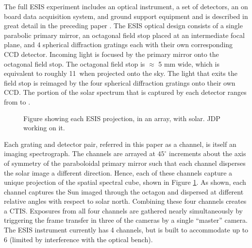     	The full ESIS experiment includes an optical instrument, a set of detectors, an on board data acquisition system, and ground support equipment and is described in great detail in the preceding paper \citep{ESIS}.
    	The ESIS optical design consists of a single parabolic primary mirror, an octagonal field stop placed at an intermediate focal plane, and 4 spherical diffraction gratings each with their own corresponding CCD detector.
    	Incoming light is focused by the primary mirror onto the octagonal field stop. 
    	The octagonal field stop is $\approx$ 5 mm wide, which is equivalent to roughly 11\arcmin \  when projected onto the sky. 
    	The light that exits the field stop is reimaged  by the four spherical diffraction gratings onto their own CCD.
    	The portion of the solar spectrum that is captured by each detector ranges from \hei to \ov.
    	
        \begin{figure}[ht]
			\begin{center}
				\caption{Figure showing each ESIS projection, in an array, with solar.  JDP working on it.}
				\label{fig:level_1_array}
			\end{center}
		\end{figure}

    	
    	
    	Each grating and detector pair, referred in this paper as a channel, is itself an imaging spectrograph.  
    	The channels are arrayed at $45^{\circ}$ increments about the axis of symmetry of the paraboloidal primary mirror such that each channel disperses the solar image a different direction. 
    	Hence, each of these channels capture a unique projection of the spatial spectral cube, shown in Figure \ref{fig:level_1_array}. 
    	As shown, each channel captures the Sun imaged through the octagon and dispersed at different relative angles with respect to solar north. Combining these four channels creates a CTIS. Exposures from all four channels are gathered nearly simultaneously by triggering the frame transfer in three of the cameras by a single ``master'' camera. 
    	The ESIS instrument currently has 4 channels, but is built to accommodate up to 6 (limited by interference with the optical bench).

